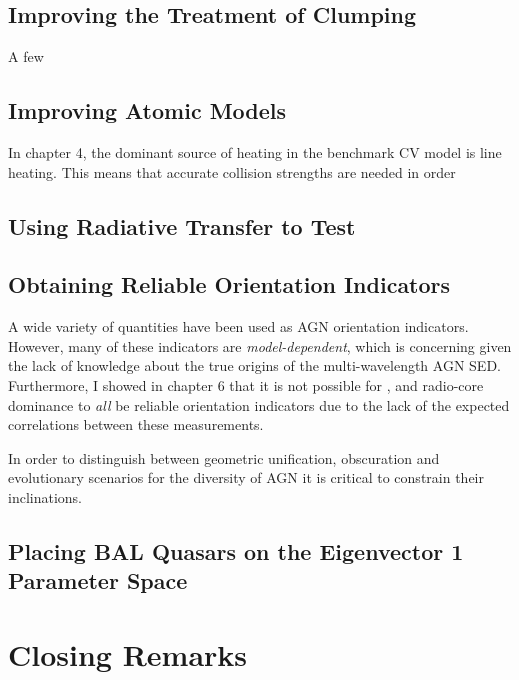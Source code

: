 \subsection{Improving the Treatment of Clumping}

A few 

\subsection{Improving Atomic Models}

In chapter 4, the dominant source of heating in the benchmark CV model
is line heating. This means that accurate collision strengths are needed
in order 

\subsection{Using Radiative Transfer to Test }

\subsection{Obtaining Reliable Orientation Indicators}

A wide variety of quantities have been used as AGN orientation
indicators. However, many of these indicators are {\em model-dependent},
which is concerning given the lack of knowledge about the true
origins of the multi-wavelength AGN SED. Furthermore, I showed in
chapter 6 that it is not possible for \ewo, \fwh and radio-core 
dominance to {\em all} be reliable orientation indicators due to
the lack of the expected correlations between these measurements.

In order to distinguish between geometric unification, obscuration 
and evolutionary scenarios for the diversity of AGN it is 
critical to constrain their inclinations.



\subsection{Placing BAL Quasars on the Eigenvector 1 Parameter Space}




\section{Closing Remarks}

